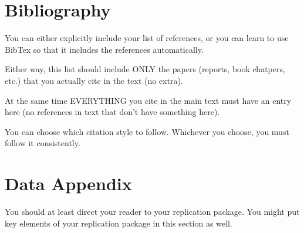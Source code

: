 \documentclass[12pt]{article}
\begin{document}
\newpage
\section*{Bibliography}
\singlespacing
\setlength\bibsep{0pt}

You can either explicitly include your list of references, or you can learn to use BibTex so that it includes the references automatically.

Either way, this list should include ONLY the papers (reports, book chatpers, etc.) that you actually cite in the text (no extra).

At the same time EVERYTHING you cite in the main text must have an entry here (no references in text that don't have something here).

You can choose which citation style to follow. Whichever you choose, you must follow it consistently.

\newpage
\section*{Data Appendix} \label{sec:appendixa}

You should at least direct your reader to your replication package. You might put key elements of your replication package in this section as well.
\end{document}
